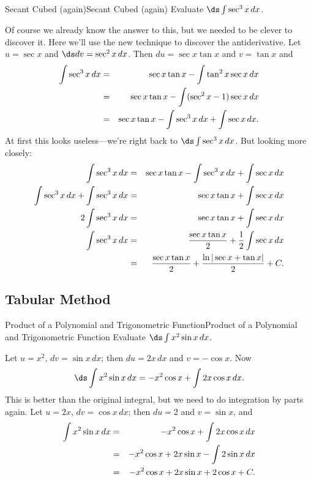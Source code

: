 \begin{example}{Secant Cubed (again)}{Secant Cubed (again)}\label{Secant Cubed (again)}
Evaluate $\ds\int\sec^3 x\,dx$. 
\end{example}

\begin{solution}
Of course we already know the answer
to this, but we needed to be clever to discover it. Here we'll use the
new technique to discover the antiderivative.
Let $u=\sec x$ and $\ds dv=\sec^2 x\,dx$. Then $du=\sec x\tan x$ and
$v=\tan x$ and
\begin{eqnarray*}
  \int\sec^3 x\,dx&=&\sec x\tan x-\int \tan^2x\sec x\,dx\cr
  &=&\sec x\tan x-\int (\sec^2x-1)\sec x\,dx\cr
  &=&\sec x\tan x-\int \sec^3x\,dx +\int\sec x\,dx.\cr
\end{eqnarray*}
At first this looks useless---we're right back to
$\ds \int\sec^3x\,dx$. But looking more closely:
\begin{eqnarray*}
  \int\sec^3x\,dx&=&\sec x\tan x-\int \sec^3x\,dx +\int\sec x\,dx\cr
  \int\sec^3x\,dx+\int \sec^3x\,dx&=&\sec x\tan x +\int\sec x\,dx\cr
  2\int\sec^3x\,dx&=&\sec x\tan x +\int\sec x\,dx\cr
  \int\sec^3x\,dx&=&{\sec x\tan x\over2} +{1\over2}\int\sec x\,dx\cr
  &=&{\sec x\tan x\over2} +{\ln|\sec x+\tan x|\over2}+C.
\end{eqnarray*}\vskip-10pt
\end{solution}

\subsection*{Tabular Method}

\begin{example}{Product of a Polynomial and Trigonometric Function}{Product of a Polynomial and Trigonometric Function}\label{Product of a Polynomial and Trigonometric Function}
Evaluate $\ds\int x^2\sin x\,dx$. 
\end{example}

\begin{solution}
Let $u=x^2$, $dv=\sin x\,dx$; then $du=2x\,dx$ and $v=-\cos x$. 
Now $$\ds \int x^2\sin x\,dx=-x^2\cos x+\int 2x\cos x\,dx.$$ 
This is
better than the original integral, but we need to do integration by
parts again. Let $u=2x$, $dv=\cos x\,dx$; then
$du=2$ and $v=\sin x$, and
\begin{eqnarray*}
  \int x^2\sin x\,dx&=&-x^2\cos x+\int 2x\cos x\,dx\cr
  &=&-x^2\cos x+ 2x\sin x - \int 2\sin x\,dx\cr
  &=&-x^2\cos x+ 2x\sin x + 2\cos x + C.
\end{eqnarray*}\vskip-10pt
\end{solution}

